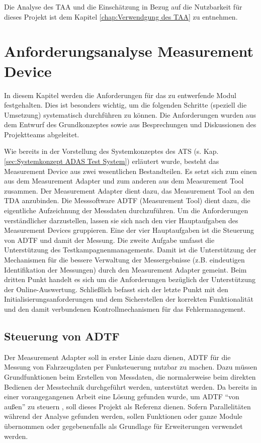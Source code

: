 \documentclass[12pt,a4paper]{report}
\begin{document}
Die Analyse des TAA und die Einschätzung in Bezug auf die Nutzbarkeit für dieses Projekt ist dem Kapitel \ref{chap:Verwendgung des TAA} zu entnehmen.
\chapter{Anforderungsanalyse Measurement Device}\label{chap:Anforderungsanalyse}
In diesem Kapitel werden die Anforderungen für das zu entwerfende Modul festgehalten. Dies ist besonders wichtig, um die folgenden Schritte (speziell die Umsetzung) systematisch durchführen zu können. Die Anforderungen wurden aus dem Entwurf des Grundkonzeptes sowie aus Besprechungen und Diskussionen des Projektteams abgeleitet.

Wie bereits in der Vorstellung des Systemkonzeptes des ATS (s. Kap. \ref{sec:Systemkonzept ADAS Test System}) erläutert wurde, besteht das Measurement Device aus zwei wesentlichen Bestandteilen. Es setzt sich zum einen aus dem Measurement Adapter und zum anderen aus dem Measurement Tool zusammen. Der Measurement Adapter dient dazu, das Measurement Tool an den TDA anzubinden. Die Messsoftware ADTF (Measurement Tool) dient dazu, die eigentliche Aufzeichnung der Messdaten durchzuführen. Um die Anforderungen verständlicher darzustellen, lassen sie sich nach den vier Hauptaufgaben des Measurement Devices gruppieren. Eine der vier Hauptaufgaben ist die Steuerung von ADTF und damit der Messung. Die zweite Aufgabe umfasst die Unterstützung des Testkampagnenmanagements. Damit ist die Unterstützung der Mechanismen für die bessere Verwaltung der Messergebnisse (z.B. eindeutigen Identifikation der Messungen) durch den Measurement Adapter gemeint. Beim dritten Punkt handelt es sich um die Anforderungen bezüglich der Unterstützung der Online-Auswertung. Schließlich befasst sich der letzte Punkt mit den Initialisierungsanforderungen und dem Sicherstellen der korrekten Funktionalität und den damit verbundenen Kontrollmechanismen für das Fehlermanagement.
\section{Steuerung von ADTF}\label{sec:Steuerung von ADTF}
Der Measurement Adapter soll in erster Linie dazu dienen, ADTF für die Messung von Fahrzeugdaten per Funksteuerung nutzbar zu machen. Dazu müssen Grundfunktionen beim Erstellen von Messdaten, die normalerweise beim direkten Bedienen der Messtechnik durchgeführt werden, unterstützt werden. Da bereits in einer vorangegangenen Arbeit eine Lösung gefunden wurde, um ADTF "`von au\ss en"' zu steuern \cite{MasterEckerlebe}, soll dieses Projekt als Referenz dienen. Sofern Parallelitäten während der Analyse gefunden werden, sollen Funktionen oder ganze Module übernommen oder gegebenenfalls als Grundlage für Erweiterungen verwendet werden.
\end{document}
